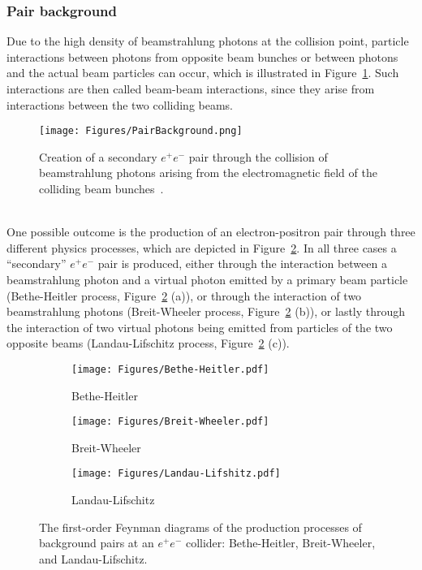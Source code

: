 \subsubsection{Pair background}
\label{BeamBeam:pairs}
Due to the high density of beamstrahlung photons at the collision point, particle interactions between photons from opposite beam bunches or between photons and the actual beam particles can occur, which is illustrated in Figure~\ref{fig:Pair_production}.
Such interactions are then called beam-beam interactions, since they arise from interactions between the two colliding beams.
\begin{figure}
\centering
\texttt{[image: Figures/PairBackground.png]}
\caption[Illustration of secondary $e^+e^-$ pair production from beamstrahlung photons]{Creation of a secondary $e^+e^-$ pair through the collision of beamstrahlung photons arising from the electromagnetic field of the colliding beam bunches~\cite[p. 29]{Vogel}.}
\label{fig:Pair_production} 
\end{figure}
\\One possible outcome is the production of an electron-positron pair through three different physics processes, which are depicted in Figure~\ref{fig:Feynman:pair_production}.
In all three cases a ``secondary'' $e^+e^-$ pair is produced, either through the interaction between a beamstrahlung photon and a virtual photon emitted by a primary beam particle (Bethe-Heitler process, Figure~\ref{fig:Feynman:pair_production} (a)),
or through the interaction of two beamstrahlung photons (Breit-Wheeler process, Figure~\ref{fig:Feynman:pair_production} (b)),
or lastly through the interaction of two virtual photons being emitted from particles of the two opposite beams (Landau-Lifschitz process, Figure~\ref{fig:Feynman:pair_production} (c)).
\begin{figure}[h]
\begin{subfigure}[b]{0.33\textwidth}
\texttt{[image: Figures/Bethe-Heitler.pdf]}
\caption{Bethe-Heitler}
\end{subfigure}
\begin{subfigure}[b]{0.33\textwidth}
\texttt{[image: Figures/Breit-Wheeler.pdf]}
\caption{Breit-Wheeler}
\end{subfigure}
\begin{subfigure}[b]{0.33\textwidth}
\texttt{[image: Figures/Landau-Lifshitz.pdf]}
\caption{Landau-Lifschitz}
\end{subfigure}
\caption[Feynman diagrams of the production of the secondary \positron\electron pairs from beamstrahlung.]{The first-order Feynman diagrams of the production processes of background pairs at an $e^+e^-$ collider: Bethe-Heitler, Breit-Wheeler, and Landau-Lifschitz.}
\label{fig:Feynman:pair_production}
\end{figure}

